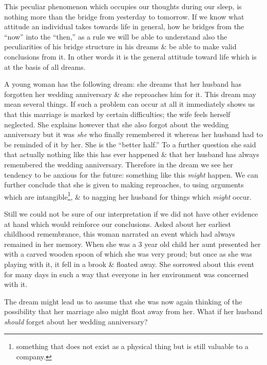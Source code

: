 \documentclass{article}
\begin{document}
This peculiar phenomenon which occupies our thoughts during our sleep, is nothing more than the bridge from yesterday to tomorrow. If we know what attitude an individual takes towards life in general, how he bridges from the ``now'' into the ``then,'' as a rule we will be able to understand also the peculiarities of his bridge structure in his dreams \& be able to make valid conclusions from it. In other words it is the general attitude toward life which is at the basis of all dreams.

A young woman has the following dream: she dreams that her husband has forgotten her wedding anniversary \& she reproaches him for it. This dream may mean several things. If such a problem can occur at all it immediately shows us that this marriage is marked by certain difficulties; the wife feels herself neglected. She explains however that she also forgot about the wedding anniversary but it was {\it she} who finally remembered it whereas her husband had to be reminded of it by her. She is the ``better half.'' To a further question she said that actually nothing like this has ever happened \& that her husband has always remembered the wedding anniversary. Therefore in the dream we see her tendency to be anxious for the future: something like this {\it might} happen. We can further conclude that she is given to making reproaches, to using arguments which are intangible\footnote{something that does not exist as a physical thing but is still valuable to a company.}, \& to nagging her husband for things which {\it might} occur.

Still we could not be sure of our interpretation if we did not have other evidence at hand which would reinforce our conclusions. Asked about her earliest childhood remembrance, this woman narrated an event which had always remained in her memory. When she was a 3 year old child her aunt presented her with a carved wooden spoon of which she was very proud; but once as she was playing with it, it fell in a brook \& floated away. She sorrowed about this event for many days in such a way that everyone in her environment was concerned with it.

The dream might lead us to assume that she was now again thinking of the possibility that her marriage also might float away from her. What if her husband {\it should} forget about her wedding anniversary?
\end{document}
